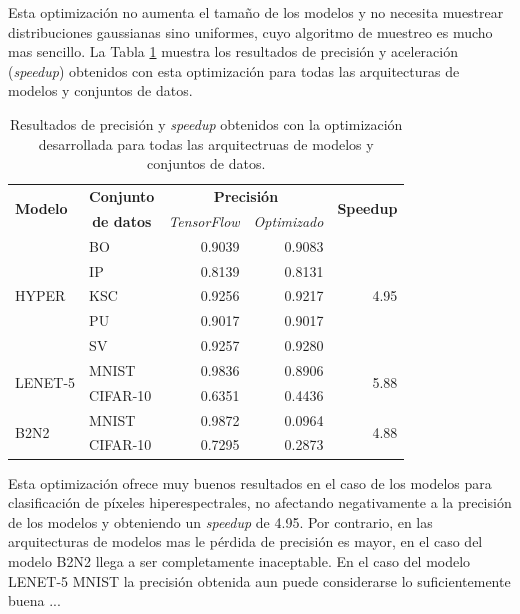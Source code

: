 Esta optimización no aumenta el tamaño de los modelos y no necesita muestrear distribuciones gaussianas sino uniformes, cuyo algoritmo de muestreo es mucho mas sencillo. La Tabla \ref{tab:uniform_opt} muestra los resultados de precisión y aceleración (\textit{speedup}) obtenidos con esta optimización para todas las arquitecturas de modelos y conjuntos de datos.

\begin{table}[h]
    \centering
    \caption{Resultados de precisión y \textit{speedup} obtenidos con la optimización desarrollada para todas las arquitectruas de modelos y conjuntos de datos.}
    \label{tab:uniform_opt}
    \begin{tabular}{llrrr}
    \hline
     \multirow{2}{*}{\textbf{Modelo}} & \textbf{Conjunto} & \multicolumn{2}{c}{\textbf{Precisión}} & \multirow{2}{*}{\textbf{Speedup}} \\
     & \multicolumn{1}{c}{\textbf{de datos}} & \multicolumn{1}{l}{\textit{TensorFlow}} & \multicolumn{1}{l}{\textit{Optimizado}} & \\ \hline
    \multirow{5}{*}{HYPER} & BO & 0.9039 & 0.9083 & \multirow{5}{*}{4.95} \\
     & IP & 0.8139 & 0.8131 & \\
     & KSC & 0.9256 & 0.9217 & \\
     & PU & 0.9017 & 0.9017 & \\
     & SV & 0.9257 & 0.9280 & \\ \hline
    \multirow{2}{*}{LENET-5} & MNIST & 0.9836 & 0.8906 & \multirow{2}{*}{5.88} \\
     & CIFAR-10 & 0.6351 & 0.4436 & \\ \hline
    \multirow{2}{*}{B2N2} & MNIST & 0.9872 & 0.0964 & \multirow{2}{*}{4.88} \\
     & CIFAR-10 & 0.7295 & 0.2873 & \\ \hline                  
    \end{tabular}
\end{table}

Esta optimización ofrece muy buenos resultados en el caso de los modelos para clasificación de píxeles hiperespectrales, no afectando negativamente a la precisión de los modelos y obteniendo un \textit{speedup} de 4.95. Por contrario, en las arquitecturas de modelos mas le pérdida de precisión es mayor, en el caso del modelo B2N2 llega a ser completamente inaceptable. En el caso del modelo LENET-5 MNIST la precisión obtenida aun puede considerarse lo suficientemente buena ... \todo
